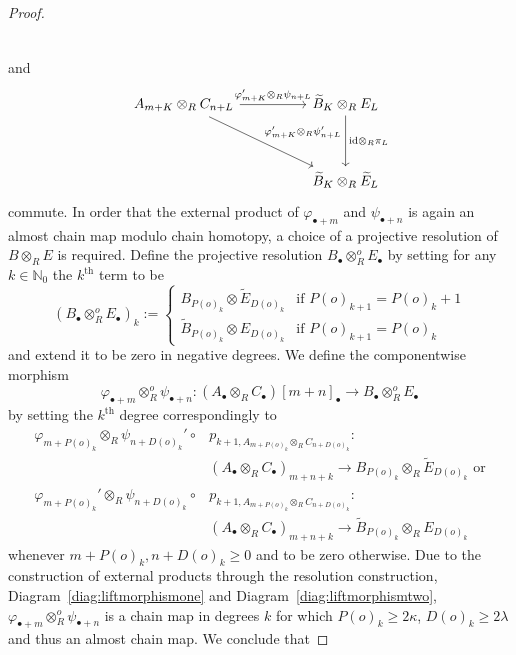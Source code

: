 \documentclass[12pt, a4paper]{article}
\numberwithin{equation}{section}
\theoremstyle{empty}
\theoremstyle{nonumberplain}
\newtheorem{proof}{Proof}
\begin{document}
\begin{proof}
\begin{equation}
\begin{tikzcd}
\end{tikzcd}
\end{equation}
and
\begin{equation}\label{diag:liftmorphismtwo}
\begin{tikzcd}
    A_{m+K} \otimes_R C_{n+L} \arrow[rr, "\varphi_{m+K}' \otimes_R \psi_{n+L}"] \arrow[ddrr, "\varphi_{m+K}' \otimes_R \psi_{n+L}'"] & & \widetilde{B}_K \otimes_R E_L \arrow[dd, "\mathrm{id} \otimes_R \pi_L"] \\ \\
    & & \widetilde{B}_K \otimes_R \widetilde{E}_L
\end{tikzcd}
\end{equation}
commute. In order that the external product of $\varphi_{\bullet+m}$ and $\psi_{\bullet+n}$ is again an almost chain map modulo chain homotopy, a choice of a projective resolution of $B \otimes_R E$ is required. Define the projective resolution $B_{\bullet} \otimes_R^o E_{\bullet}$ by setting for any $k \in \mathbb{N}_0$ the $k^{\text{th}}$ term to be
\[ (B_{\bullet} \otimes_R^o E_{\bullet})_k := \begin{cases} B_{P(o)_k} \otimes \widetilde{E}_{D(o)_k} &\text{if } P(o)_{k+1} = P(o)_k +1 \\
\widetilde{B}_{P(o)_k} \otimes E_{D(o)_k} &\text{if } P(o)_{k+1} = P(o)_k \end{cases} \]
and extend it to be zero in negative degrees. We define the componentwise morphism
\[ \varphi_{\bullet+m} \otimes_R^o \psi_{\bullet+n}: (A_{\bullet} \otimes_R C_{\bullet})[m+n]_{\bullet} \rightarrow B_{\bullet} \otimes_R^o E_{\bullet} \]
by setting the $k^{\text{th}}$ degree correspondingly to
\begin{align*}
\varphi_{m+P(o)_k} \otimes_R \psi_{n+D(o)_k}' \circ &p_{k+1, A_{m+P(o)_k} \otimes_R C_{n+D(o)_k}}: \\
&(A_{\bullet} \otimes_R C_{\bullet})_{m+n+k} \rightarrow B_{P(o)_k} \otimes_R \widetilde{E}_{D(o)_k} \text{ or} \\
\varphi_{m+P(o)_k}' \otimes_R \psi_{n+D(o)_k} \circ &p_{k+1, A_{m+P(o)_k} \otimes_R C_{n+D(o)_k}}: \\
&(A_{\bullet} \otimes_R C_{\bullet})_{m+n+k} \rightarrow \widetilde{B}_{P(o)_k} \otimes_R E_{D(o)_k}
\end{align*}
whenever $m+P(o)_k, n+D(o)_k \geq 0$ and to be zero otherwise. Due to the construction of external products through the resolution construction, Diagram~\ref{diag:liftmorphismone} and Diagram~\ref{diag:liftmorphismtwo}, $\varphi_{\bullet+m} \otimes_R^o \psi_{\bullet+n}$ is a chain map in degrees $k$ for which $P(o)_k \geq 2{\kappa}$, $D(o)_k \geq 2{\lambda}$ and thus an almost chain map. We conclude that

\end{proof}
\end{document}

